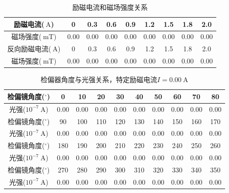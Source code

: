 \documentclass{ctexart}
\newcommand{\si}[1]{\  \mathrm{#1}}
\begin{document}
    \newpage
    \begin{table}[H]
        \centering
        \begin{tabular}{|c|c|c|c|c|c|c|c|c|}
            \hline
            励磁电流($\si{A}$)   & 0    & 0.3  & 0.6  & 0.9  & 1.2  & 1.5  & 1.8  & 2.0  \\\hline
            磁场强度($\si{mT}$)  & 0.00 & 0.00 & 0.00 & 0.00 & 0.00 & 0.00 & 0.00 & 0.00 \\\hline
            反向励磁电流($\si{A}$) & 0    & 0.3  & 0.6  & 0.9  & 1.2  & 1.5  & 1.8  & 2.0  \\\hline
            磁场强度($\si{mT}$)  & 0.00 & 0.00 & 0.00 & 0.00 & 0.00 & 0.00 & 0.00 & 0.00 \\\hline
        \end{tabular}
        \caption{励磁电流和磁场强度关系}
    \end{table}
    \newpage
    \begin{table}[H]
        \centering
        \begin{tabular}{|c|c|c|c|c|c|c|c|c|c|}
            \hline
            检偏镜角度(${}^{\circ}$)  & 0    & 10   & 20   & 30   & 40   & 50   & 60   & 70   & 80   \\\hline
            光强($10^{-7} \si{A}$) & 0.00 & 0.00 & 0.00 & 0.00 & 0.00 & 0.00 & 0.00 & 0.00 & 0.00 \\\hline
            检偏镜角度(${}^{\circ}$)  & 90   & 100  & 110  & 120  & 130  & 140  & 150  & 160  & 170  \\\hline
            光强($10^{-7} \si{A}$) & 0.00 & 0.00 & 0.00 & 0.00 & 0.00 & 0.00 & 0.00 & 0.00 & 0.00 \\\hline
            检偏镜角度(${}^{\circ}$)  & 180  & 190  & 200  & 210  & 220  & 230  & 240  & 250  & 260  \\\hline
            光强($10^{-7} \si{A}$) & 0.00 & 0.00 & 0.00 & 0.00 & 0.00 & 0.00 & 0.00 & 0.00 & 0.00 \\\hline
            检偏镜角度(${}^{\circ}$)  & 270  & 280  & 290  & 300  & 310  & 320  & 330  & 340  & 350  \\\hline
            光强($10^{-7} \si{A}$) & 0.00 & 0.00 & 0.00 & 0.00 & 0.00 & 0.00 & 0.00 & 0.00 & 0.00 \\\hline
        \end{tabular}
        \caption{检偏器角度与光强关系，特定励磁电流$I=0.00 \si{A}$}
    \end{table}
\end{document}
